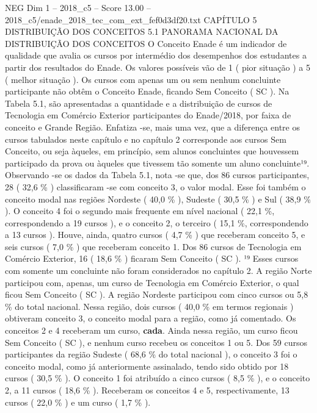 \begin{textsample}{NEG Dim 1 – 2018\_c5 – Score 13.00 – 2018\_c5/enade\_2018\_tec\_com\_ext\_fef0d3df20.txt}  \label{ex:f1_neg_373}
CAPÍTULO 5 DISTRIBUIÇÃO DOS CONCEITOS 5.1 PANORAMA NACIONAL DA DISTRIBUIÇÃO DOS CONCEITOS O Conceito Enade é um indicador de qualidade que avalia os cursos por intermédio dos desempenhos dos estudantes a partir dos resultados do Enade.
Os valores possíveis vão de 1 ( pior situação ) a 5 ( melhor situação ).
Os cursos com apenas um ou sem nenhum concluinte participante não obtêm o Conceito Enade, ficando Sem Conceito ( SC ).
Na Tabela 5.1, são apresentadas a quantidade e a distribuição de cursos de Tecnologia em Comércio Exterior participantes do Enade/2018, por faixa de conceito e Grande Região.
Enfatiza -se, mais uma vez, que a diferença entre os cursos tabulados neste capítulo e no capítulo 2 corresponde aos cursos Sem Conceito, ou seja àqueles, em princípio, sem alunos concluintes que houvessem participado da prova ou àqueles que tivessem tão somente um aluno concluinte¹⁹.
Observando -se os dados da Tabela 5.1, nota -se que, dos 86 cursos participantes, 28 ( 32,6 \% ) classificaram -se com conceito 3, o valor modal.
Esse foi também o conceito modal nas regiões Nordeste ( 40,0 \% ), Sudeste ( 30,5 \% ) e Sul ( 38,9 \% ).
O conceito 4 foi o segundo mais frequente em nível nacional ( 22,1 \%, correspondendo a 19 cursos ), e o conceito 2, o terceiro ( 15,1 \%, correspondendo a 13 cursos ).
Houve, ainda, quatro cursos ( 4,7 \% ) que receberam conceito 5, e seis cursos ( 7,0 \% ) que receberam conceito 1.
Dos 86 cursos de Tecnologia em Comércio Exterior, 16 ( 18,6 \% ) ficaram Sem Conceito ( SC ). ¹⁹ Esses cursos com somente um concluinte não foram considerados no capítulo 2.
A região Norte participou com, apenas, um curso de Tecnologia em Comércio Exterior, o qual ficou Sem Conceito ( SC ).
A região Nordeste participou com cinco cursos ou 5,8 \% do total nacional.
Nessa região, dois cursos ( 40,0 \% em termos regionais ) obtiveram conceito 3, o conceito modal para a região, como já comentado.
Os conceitos 2 e 4 receberam um curso, \textbf{cada}.
Ainda nessa região, um curso ficou Sem Conceito ( SC ), e nenhum curso recebeu os conceitos 1 ou 5.
Dos 59 cursos participantes da região Sudeste ( 68,6 \% do total nacional ), o conceito 3 foi o conceito modal, como já anteriormente assinalado, tendo sido obtido por 18 cursos ( 30,5 \% ).
O conceito 1 foi atribuído a cinco cursos ( 8,5 \% ), e o conceito 2, a 11 cursos ( 18,6 \% ).
Receberam os conceitos 4 e 5, respectivamente, 13 cursos ( 22,0 \% ) e um curso ( 1,7 \% ).

\end{textsample}
